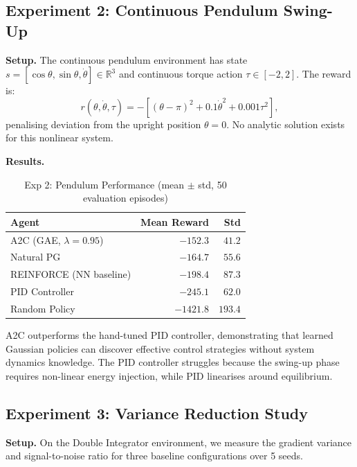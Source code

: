 \documentclass[11pt, a4paper]{article}
\newcommand{\R}{\mathbb{R}}
\begin{document}
\subsection{Experiment 2: Continuous Pendulum Swing-Up}
\label{sec:exp2}

\textbf{Setup.}
The continuous pendulum environment has state $s = [\cos\theta, \sin\theta, \dot\theta] \in \R^3$
and continuous torque action $\tau \in [-2, 2]$.
The reward is:
\begin{equation}
    r(\theta, \dot\theta, \tau) = -\left[(\theta - \pi)^2 + 0.1\dot\theta^2 + 0.001\tau^2\right],
\end{equation}
penalising deviation from the upright position $\theta = 0$.
No analytic solution exists for this nonlinear system.

\textbf{Results.}
\begin{table}[h]
\centering
\caption{Exp 2: Pendulum Performance (mean $\pm$ std, 50 evaluation episodes)}
\label{tab:exp2}
\begin{tabular}{lrr}
\toprule
\textbf{Agent} & \textbf{Mean Reward} & \textbf{Std} \\
\midrule
A2C (GAE, $\lambda=0.95$) & $-152.3$ & $41.2$ \\
Natural PG                & $-164.7$ & $55.6$ \\
REINFORCE (NN baseline)   & $-198.4$ & $87.3$ \\
PID Controller            & $-245.1$ & $62.0$ \\
Random Policy             & $-1421.8$ & $193.4$ \\
\bottomrule
\end{tabular}
\end{table}

A2C outperforms the hand-tuned PID controller, demonstrating that learned
Gaussian policies can discover effective control strategies without system
dynamics knowledge.
The PID controller struggles because the swing-up phase requires non-linear
energy injection, while PID linearises around equilibrium.

\subsection{Experiment 3: Variance Reduction Study}
\label{sec:exp3}

\textbf{Setup.}
On the Double Integrator environment, we measure the gradient variance and
signal-to-noise ratio for three baseline configurations over 5 seeds.
\end{document}
